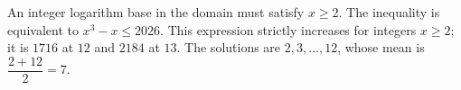 An integer logarithm base in the domain must satisfy $x\ge2$. The inequality is equivalent to $x^3-x\le2026$. This expression strictly increases for integers $x\ge2$; it is $1716$ at $12$ and $2184$ at $13$. The solutions are $2,3,\ldots,12$, whose mean is $\dfrac{2+12}{2}=\boxed7$.
